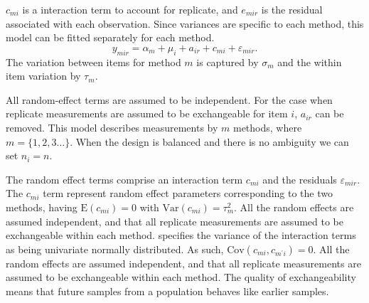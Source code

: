 \documentclass[12pt, a4paper]{report}
\theoremstyle{plain}
\theoremstyle{definition}
\theoremstyle{remark}
\begin{document}
	
	
	$c_{mi}$ is a interaction term to account for replicate, and $e_{mir}$ is the residual associated with each observation. Since variances are specific to each method, this model can be fitted separately for each method.
	\begin{equation}\label{BXC-model}
	y_{mir}  = \alpha_{m} + \mu_{i} + a_{ir} + c_{mi} + \varepsilon_{mir}.
	\end{equation}
	The variation between items for method $m$ is captured by $\sigma_m$ and the within item variation by $\tau_m$.	
	
	All random-effect terms are assumed to be independent. For the case when replicate measurements are assumed to be exchangeable for item $i$, $a_{ir}$ can be removed. This model describes measurements by $m$ methods, where $m = \{1,2,3\ldots\}$. When the design is balanced and there is no ambiguity we can set $n_i=n$.
	
	The random effect terms comprise an interaction term $c_{mi}$ and the residuals $\varepsilon_{mir}$. The $c_{mi}$ term represent random effect parameters corresponding to the two methods, having $\mathrm{E}(c_{mi})= 0$ with $\mathrm{Var}(c_{mi})=\tau^2_m$. All the random effects are assumed independent, and that all replicate measurements are assumed to be exchangeable within each method.
%	
\citet{BXC2008} specifies the variance of the interaction terms as being univariate normally distributed. As such, $\mathrm{Cov}(c_{mi}, c_{m^\prime i})= 0.$ All the random effects are assumed independent, and that all replicate measurements are assumed to be exchangeable within each method.
The quality of exchangeability means that future samples from a population behaves like earlier samples.	

	
\end{document}
